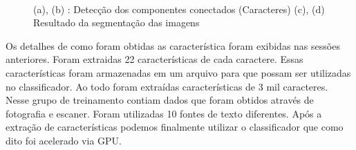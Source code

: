 \documentclass[letterpaper, 10 pt, conference]{ieeeconf}  %
\begin{document}
\begin{figure}[H] \centering

\\

\caption{(a), (b) : Detecção dos componentes conectados (Caracteres) (c), (d)
Resultado da segmentação das imagens}
\label{fig:resDil}
\end{figure}

Os detalhes de como foram obtidas as característica foram exibidas nas sessões
anteriores. Foram extraidas 22 características de cada caractere. Essas
características foram armazenadas em um arquivo para que possam ser utilizadas
no classificador. Ao todo foram extraídas características de 3 mil
caracteres. Nesse grupo de treinamento contiam dados que foram obtidos através
de fotografia e escaner. Foram utilizadas 10 fontes de texto diferentes.
Após a extração de características podemos finalmente utilizar o classificador
que como dito foi acelerado via GPU.
\end{document}

